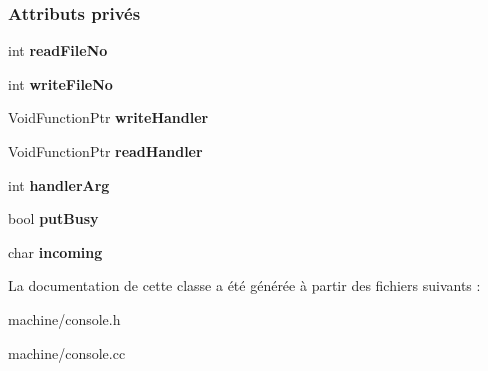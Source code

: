 \subsubsection*{Attributs privés}
\begin{DoxyCompactItemize}
\item 
\hypertarget{class_console_a5bef93c9fefee9f1449ff30c2937411f}{}\label{class_console_a5bef93c9fefee9f1449ff30c2937411f} 
int {\bfseries read\+File\+No}
\item 
\hypertarget{class_console_ab9368216fde993c2cbf8309abb681985}{}\label{class_console_ab9368216fde993c2cbf8309abb681985} 
int {\bfseries write\+File\+No}
\item 
\hypertarget{class_console_a061fe2979a56e61810ed2a245339a5e4}{}\label{class_console_a061fe2979a56e61810ed2a245339a5e4} 
Void\+Function\+Ptr {\bfseries write\+Handler}
\item 
\hypertarget{class_console_a75b91f9f02c7c7627708a747b558b45f}{}\label{class_console_a75b91f9f02c7c7627708a747b558b45f} 
Void\+Function\+Ptr {\bfseries read\+Handler}
\item 
\hypertarget{class_console_a12c94d0943c0203eab80aa1a2296f423}{}\label{class_console_a12c94d0943c0203eab80aa1a2296f423} 
int {\bfseries handler\+Arg}
\item 
\hypertarget{class_console_a5a2296912ae98026f275b746ff6f0192}{}\label{class_console_a5a2296912ae98026f275b746ff6f0192} 
bool {\bfseries put\+Busy}
\item 
\hypertarget{class_console_a3439910600490f41d70b02e1dd9acd91}{}\label{class_console_a3439910600490f41d70b02e1dd9acd91} 
char {\bfseries incoming}
\end{DoxyCompactItemize}


La documentation de cette classe a été générée à partir des fichiers suivants \+:\begin{DoxyCompactItemize}
\item 
machine/console.\+h\item 
machine/console.\+cc\end{DoxyCompactItemize}
